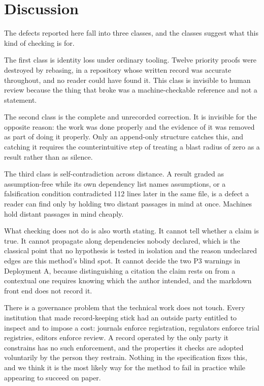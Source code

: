 \documentclass[journal]{IEEEtran}
\begin{document}
\section{Discussion}

The defects reported here fall into three classes, and the classes suggest what
this kind of checking is for.

The first class is identity loss under ordinary tooling. Twelve priority proofs
were destroyed by rebasing, in a repository whose written record was accurate
throughout, and no reader could have found it. This class is invisible to human
review because the thing that broke was a machine-checkable reference and not a
statement.

The second class is the complete and unrecorded correction. It is invisible for
the opposite reason: the work was done properly and the evidence of it was
removed as part of doing it properly. Only an append-only structure catches this,
and catching it requires the counterintuitive step of treating a blast radius of
zero as a result rather than as silence.

The third class is self-contradiction across distance. A result graded as
assumption-free while its own dependency list names assumptions, or a
falsification condition contradicted 112 lines later in the same file, is a
defect a reader can find only by holding two distant passages in mind at once.
Machines hold distant passages in mind cheaply.

What checking does not do is also worth stating. It cannot tell whether a claim
is true. It cannot propagate along dependencies nobody declared, which is the
classical point that no hypothesis is tested in isolation and the reason
undeclared edges are this method's blind spot. It cannot decide the two P3
warnings in Deployment A, because distinguishing a citation the claim rests on
from a contextual one requires knowing which the author intended, and the
markdown front end does not record it.

There is a governance problem that the technical work does not touch. Every
institution that made record-keeping stick had an outside party entitled to
inspect and to impose a cost: journals enforce registration, regulators enforce
trial registries, editors enforce review. A record operated by the only party it
constrains has no such enforcement, and the properties it checks are adopted
voluntarily by the person they restrain. Nothing in the specification fixes this,
and we think it is the most likely way for the method to fail in practice while
appearing to succeed on paper.
\end{document}
